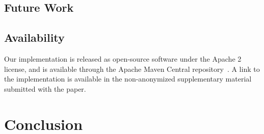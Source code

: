 \documentclass[preprint]{sigplanconf}
\theoremstyle{definition}
\begin{document}
\subsection{Future Work}
\label{sec:future-work}

\subsection{Availability}
\label{sec:availability}

Our implementation is released as open-source software under the Apache 2 license, and is available
through the Apache Maven Central repository~\cite{maven}. A link to the implementation is available in
the non-anonymized supplementary material submitted with the paper.

\section{Conclusion}
\label{sec:conclusion}




\end{document}

